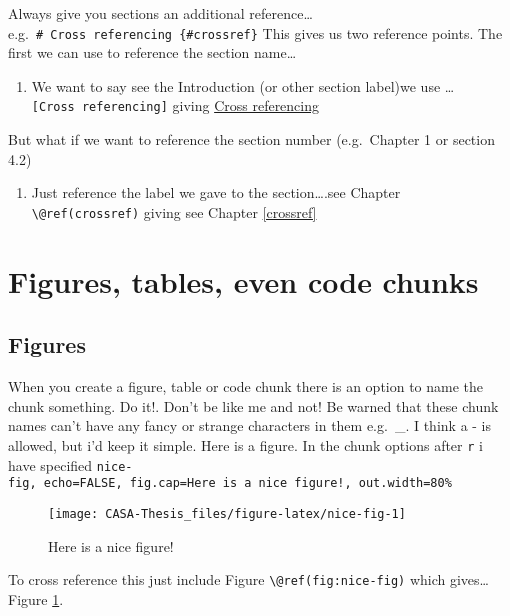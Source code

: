\documentclass[
  12pt,
  oneside]{book}
\providecommand{\tightlist}{%
  \setlength{\itemsep}{0pt}\setlength{\parskip}{0pt}}
\begin{document}
Always give you sections an additional reference\ldots e.g.~\texttt{\#\ Cross\ referencing\ \{\#crossref\}} This gives us two reference points. The first we can use to reference the section name\ldots{}

\begin{enumerate}
\def\labelenumi{\arabic{enumi}.}
\tightlist
\item
  We want to say see the Introduction (or other section label)we use \ldots{}\texttt{{[}Cross\ referencing{]}} giving \protect\hyperlink{crossref}{Cross referencing}
\end{enumerate}

But what if we want to reference the section number (e.g.~Chapter 1 or section 4.2)

\begin{enumerate}
\def\labelenumi{\arabic{enumi}.}
\tightlist
\item
  Just reference the label we gave to the section\ldots.see Chapter \texttt{\textbackslash{}@ref(crossref)} giving see Chapter \ref{crossref}
\end{enumerate}

\hypertarget{figures-tables-even-code-chunks}{%
\section{Figures, tables, even code chunks}\label{figures-tables-even-code-chunks}}

\hypertarget{figures}{%
\subsection{Figures}\label{figures}}

When you create a figure, table or code chunk there is an option to name the chunk something. Do it!. Don't be like me and not! Be warned that these chunk names can't have any fancy or strange characters in them e.g.~\_. I think a - is allowed, but i'd keep it simple. Here is a figure. In the chunk options after \texttt{r} i have specified \texttt{nice-fig,\ echo=FALSE,\ fig.cap=\textquotesingle{}Here\ is\ a\ nice\ figure!\textquotesingle{},\ out.width=\textquotesingle{}80\%\textquotesingle{}}

\begin{figure}
\texttt{[image: CASA-Thesis\_files/figure-latex/nice-fig-1]} \caption{Here is a nice figure!}\label{fig:nice-fig}
\end{figure}

To cross reference this just include Figure \texttt{\textbackslash{}@ref(fig:nice-fig)} which gives\ldots Figure \ref{fig:nice-fig}.
\end{document}
